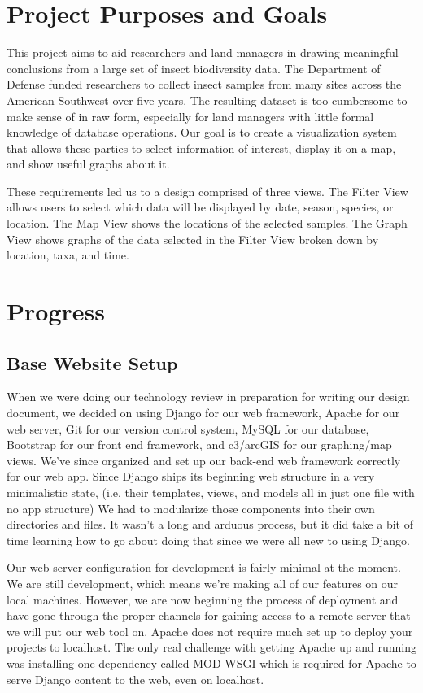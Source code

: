 \documentclass[10pt,peerreview,onecolumn,draftclsnofoot,technote]{IEEEtran}
\begin{document}
\section{Project Purposes and Goals} %
This project aims to aid researchers and land managers in drawing meaningful conclusions from a large set of insect biodiversity data.
The Department of Defense funded researchers to collect insect samples from many sites across the American Southwest over five years.
The resulting dataset is too cumbersome to make sense of in raw form, especially for land managers with little formal knowledge of database operations.
Our goal is to create a visualization system that allows these parties to select information of interest, display it on a map, and show useful graphs about it.

These requirements led us to a design comprised of three views.
The Filter View allows users to select which data will be displayed by date, season, species, or location.
The Map View shows the locations of the selected samples.
The Graph View shows graphs of the data selected in the Filter View broken down by location, taxa, and time.


\section{Progress}

\subsection{Base Website Setup} %
When we were doing our technology review in preparation for writing our design document, we decided on using Django for our web framework, Apache for our web server, Git for our version control system, MySQL for our database, Bootstrap for our front end framework, and c3/arcGIS for our graphing/map views.
We’ve since organized and set up our back-end web framework correctly for our web app.
Since Django ships its beginning web structure in a very minimalistic state, (i.e. their templates, views, and models all in just one file with no app structure) We had to modularize those components into their own directories and files.
It wasn’t a long and arduous process, but it did take a bit of time learning how to go about doing that since we were all new to using Django.

Our web server configuration for development is fairly minimal at the moment.
We are still development, which means we’re making all of our features on our local machines.
However, we are now beginning the process of deployment and have gone through the proper channels for gaining access to a remote server that we will put our web tool on.
Apache does not require much set up to deploy your projects to localhost.
The only real challenge with getting Apache up and running was installing one dependency called MOD-WSGI which is required for Apache to serve Django content to the web, even on localhost.
\end{document}
